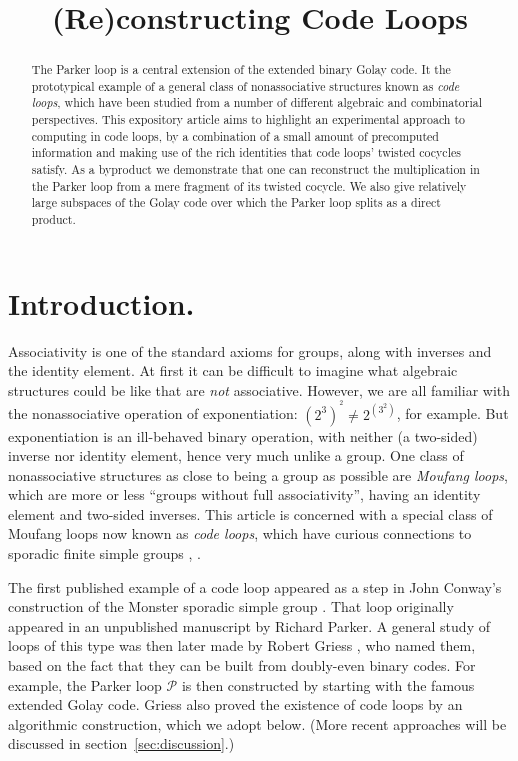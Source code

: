 \documentclass{article}
\theoremstyle{plain}
\theoremstyle{definition}
\def \cP {\mathcal{P}}
\begin{document}
\title{(Re)constructing Code Loops}
\author{%
}

\maketitle

\begin{abstract}
The Parker loop is a central extension of the extended binary Golay code. It the prototypical example of a general class of nonassociative structures known as \emph{code loops}, which have been studied from a number of different algebraic and combinatorial perspectives.
This expository article aims to highlight an experimental approach to computing in code loops, by a combination of a small amount of precomputed information and making use of the rich identities that code loops' twisted cocycles satisfy.
As a byproduct we demonstrate that one can reconstruct the multiplication in the Parker loop from a mere fragment of its twisted cocycle. 
We also give relatively large subspaces of the Golay code over which the Parker loop splits as a direct product.
\end{abstract}


\section{Introduction.}

Associativity is one of the standard axioms for groups, along with inverses and the identity element.
At first it can be difficult to imagine what algebraic structures could be like that are \emph{not} associative. 
However, we are all familiar with the nonassociative operation of exponentiation:  $(2^3)^{\!{}^2} \neq 2^{(3^2)}$, for example.
But exponentiation is an ill-behaved binary operation, with neither (a two-sided) inverse nor identity element, hence very much unlike a group. 
One class of nonassociative structures as close to being a group as possible are \emph{Moufang loops}, which are more or less ``groups without full associativity'', having an identity element and two-sided inverses.
This article is concerned with a special class of Moufang loops now known as \emph{code loops}, which have curious connections to sporadic finite simple groups \cite{Conway}, \cite[\S 7]{Griess87}.

The first published example of a code loop appeared as a step in John Conway's construction of the Monster sporadic simple group \cite{Conway}. 
That loop originally appeared in an unpublished manuscript by Richard Parker.
A general study of loops of this type was then later made by Robert Griess \cite{Griess}, who named them, based on the fact that they can be built from doubly-even binary codes. 
For example, the Parker loop $\cP$ is then constructed by starting with the famous extended Golay code.
Griess also proved the existence of code loops by an algorithmic construction, which we adopt below.
(More recent approaches will be discussed in section~\ref{sec:discussion}.)
\end{document}
